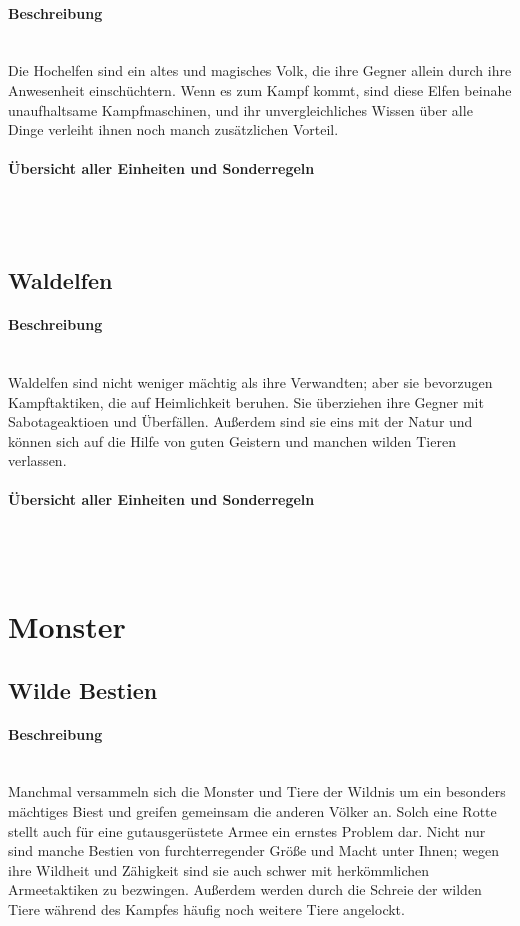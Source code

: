 \documentclass[a4paper,11pt]{report}
\begin{document}
\paragraph{Beschreibung}~\\
Die Hochelfen sind ein altes und magisches Volk, die ihre Gegner allein durch ihre Anwesenheit einschüchtern. Wenn es zum Kampf kommt, sind diese Elfen beinahe unaufhaltsame Kampfmaschinen, und ihr unvergleichliches Wissen über alle Dinge verleiht ihnen noch manch zusätzlichen Vorteil.

\paragraph{Übersicht aller Einheiten und Sonderregeln}~\\
\\



\subsection{Waldelfen}
\paragraph{Beschreibung}~\\
Waldelfen sind nicht weniger mächtig als ihre Verwandten; aber sie bevorzugen Kampftaktiken, die auf Heimlichkeit beruhen. Sie überziehen ihre Gegner mit Sabotageaktioen und Überfällen. Außerdem sind sie eins mit der Natur und können sich auf die Hilfe von guten Geistern und manchen wilden Tieren verlassen.

\paragraph{Übersicht aller Einheiten und Sonderregeln}~\\
%
\\


\section{Monster}
\subsection{Wilde Bestien}
\paragraph{Beschreibung}~\\
Manchmal versammeln sich die Monster und Tiere der Wildnis um ein besonders mächtiges Biest und greifen gemeinsam die anderen Völker an. Solch eine Rotte stellt auch für eine gutausgerüstete Armee ein ernstes Problem dar. Nicht nur sind manche Bestien von furchterregender Größe und Macht unter Ihnen; wegen ihre Wildheit und Zähigkeit sind sie auch schwer mit herkömmlichen Armeetaktiken zu bezwingen. Außerdem werden durch die Schreie der wilden Tiere während des Kampfes häufig noch weitere Tiere angelockt.
\end{document}
